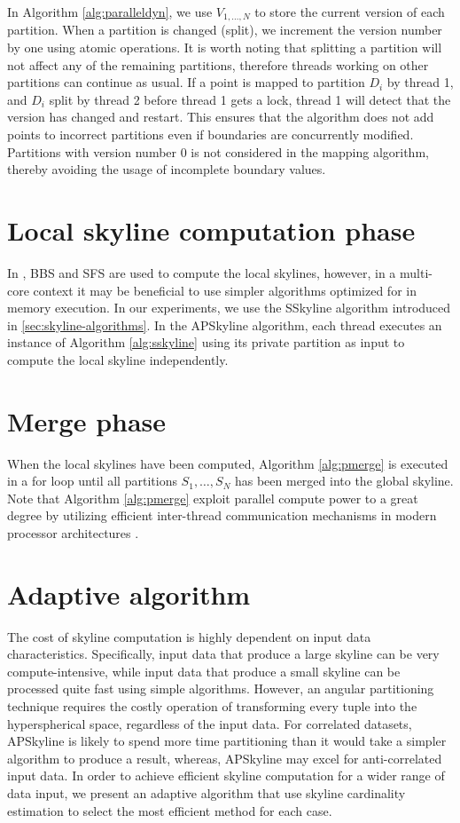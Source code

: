\documentclass[12pt,a4paper,twoside]{report}
\begin{document}
In Algorithm \ref{alg:paralleldyn}, we use $V_{1,\ldots,N}$ to store
the current version of each partition. When a partition is changed
(split), we increment the version number by one using atomic
operations. It is worth noting that splitting a partition will not
affect any of the remaining partitions, therefore threads working on
other partitions can continue as usual. If a point is mapped to
partition $D_i$ by thread 1, and $D_i$ split by thread 2 before thread
1 gets a lock, thread 1 will detect that the version has changed and
restart. This ensures that the algorithm does not add points to
incorrect partitions even if boundaries are concurrently modified.
Partitions with version number 0 is not considered in the mapping
algorithm, thereby avoiding the usage of incomplete boundary values.

\section{Local skyline computation phase}

In \cite{vlachou2008angle}, BBS and SFS are used to compute the local
skylines, however, in a multi-core context it may be beneficial to use
simpler algorithms optimized for in memory execution. In our
experiments, we use the SSkyline algorithm introduced in
\ref{sec:skyline-algorithms}. In the APSkyline algorithm, each thread
executes an instance of Algorithm \ref{alg:sskyline} using its private
partition as input to compute the local skyline independently.

\section{Merge phase}

When the local skylines have been computed, Algorithm \ref{alg:pmerge}
is executed in a for loop until all partitions $S_1,\ldots,S_N$ has
been merged into the global skyline.  Note that Algorithm
\ref{alg:pmerge} exploit parallel compute power to a great degree by
utilizing efficient inter-thread communication mechanisms in modern
processor architectures \cite{park2009parallel}.

\section{Adaptive algorithm}
\label{sec:adaptive-algorithm}

The cost of skyline computation is highly dependent on input data
characteristics. Specifically, input data that produce a large
skyline can be very compute-intensive, while input data that produce a
small skyline can be processed quite fast using simple algorithms.
However, an angular partitioning technique requires the costly
operation of transforming every tuple into the hyperspherical space,
regardless of the input data. For correlated datasets, APSkyline is
likely to spend more time partitioning than it would take a simpler
algorithm to produce a result, whereas, APSkyline may excel for
anti-correlated input data.  In order to achieve efficient skyline
computation for a wider range of data input, we present an adaptive
algorithm that use skyline cardinality estimation to select the most
efficient method for each case.
\end{document}
